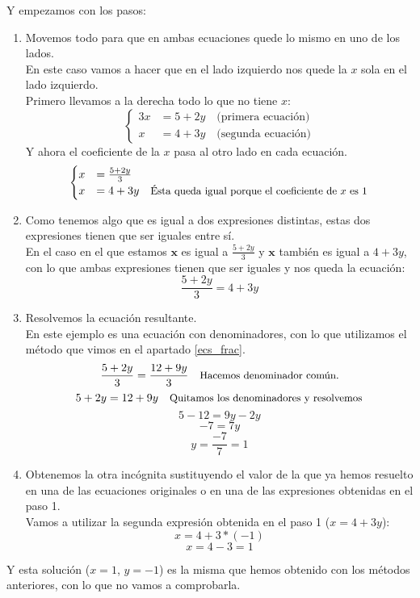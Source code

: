 \documentclass[a4paper,11pt,answers]{exam}
\begin{document}
   Y empezamos con los pasos:
   \begin{enumerate}
   \item Movemos todo para que en ambas ecuaciones quede lo mismo en uno de los lados.\\
     En este caso vamos a hacer que en el lado izquierdo nos quede la $x$ sola en el lado izquierdo.\\
     
     \quad Primero llevamos a la derecha todo lo que no tiene $x$:
     \[
       \begin{cases}
         3x&=5+2y \quad \text{(primera ecuación)}\\
         x&= 4 + 3y \quad \text{(segunda ecuación)}
       \end{cases}
     \]
     \quad Y ahora el coeficiente de la $x$ pasa al otro lado en cada ecuación.
     \[
       \begin{cases}
         x&=\frac{5+2y}{3} \\
         x&= 4 + 3y \quad \text{\small{Ésta queda igual porque el coeficiente
            de $x$ es 1}}
       \end{cases}
     \]
   \item Como tenemos algo que es igual a dos expresiones distintas, estas dos expresiones tienen que ser iguales entre sí.\\
     En el caso en el que estamos $\boldsymbol{x}$ es igual a $\frac{5+2y}{3}$ y $\boldsymbol{x}$ también es igual a $4 + 3y$, con lo que ambas expresiones tienen que ser iguales y nos queda la ecuación:
     \[\frac{5+2y}{3} = 4+3y\]
   \item Resolvemos la ecuación resultante.\\
     En este ejemplo es una ecuación con denominadores, con lo que utilizamos el método que vimos en el apartado \ref{ecs_frac}.
     \[\frac{5+2y}{3} = \frac{12+9y}{3}\quad\text{\small{Hacemos denominador común.}}\]
     \[5+2y = 12+9y\quad\text{\small{Quitamos los denominadores y resolvemos}}\]
     \[5 - 12 = 9y -2y\]
     \[-7 = 7y\]
     \[y = \frac{-7}{7} = 1\]
   \item Obtenemos la otra incógnita sustituyendo el valor de la que ya hemos resuelto en una de las ecuaciones originales o en una de las expresiones obtenidas en el paso 1.\\
     Vamos a utilizar la segunda expresión obtenida en el paso 1 ($x = 4 + 3y$):
     \[x = 4 + 3* (-1)\]
     \[x = 4 -3 = 1\]
   \end{enumerate}
  Y esta solución ($x=1$, $y=-1$) es la misma que hemos obtenido con los métodos anteriores, con lo que no vamos a comprobarla.
\end{document}
